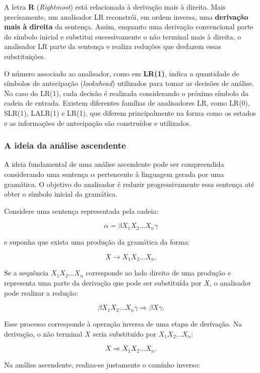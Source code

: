 \documentclass[
  brazilian,
  letterpaper,
]{book}
\theoremstyle{plain}
\theoremstyle{definition}
\theoremstyle{remark}
\begin{document}
A letra \textbf{R} (\emph{Rightmost}) está relacionada à derivação mais
à direita. Mais precisamente, um analisador LR reconstrói, em ordem
inversa, uma \textbf{derivação mais à direita} da sentença. Assim,
enquanto uma derivação convencional parte do símbolo inicial e substitui
sucessivamente o não terminal mais à direita, o analisador LR parte da
sentença e realiza reduções que desfazem essas substituições.

O número associado ao analisador, como em \textbf{LR(1)}, indica a
quantidade de símbolos de antecipação (\emph{lookahead}) utilizados para
tomar as decisões de análise. No caso do LR(1), cada decisão é realizada
considerando o próximo símbolo da cadeia de entrada. Existem diferentes
famílias de analisadores LR, como LR(0), SLR(1), LALR(1) e LR(1), que
diferem principalmente na forma como os estados e as informações de
antecipação são construídos e utilizados.

\subsubsection{A ideia da análise
ascendente}\label{a-ideia-da-anuxe1lise-ascendente}

A ideia fundamental de uma análise ascendente pode ser compreendida
considerando uma sentença \(\alpha\) pertencente à linguagem gerada por
uma gramática. O objetivo do analisador é reduzir progressivamente essa
sentença até obter o símbolo inicial da gramática.

Considere uma sentença representada pela cadeia:

\[
\alpha = \beta X_1X_2\ldots X_n\gamma
\]

e suponha que exista uma produção da gramática da forma:

\[
X\rightarrow X_1X_2\ldots X_n.
\]

Se a sequência \(X_1X_2\ldots X_n\) corresponde ao lado direito de uma
produção e representa uma parte da derivação que pode ser substituída
por \(X\), o analisador pode realizar a redução:

\[
\beta X_1X_2\ldots X_n\gamma
\Rightarrow
\beta X\gamma.
\]

Esse processo corresponde à operação inversa de uma etapa de derivação.
Na derivação, o não terminal \(X\) seria substituído por
\(X_1X_2\ldots X_n\):

\[
X\Rightarrow X_1X_2\ldots X_n.
\]

Na análise ascendente, realiza-se justamente o caminho inverso:
\end{document}
